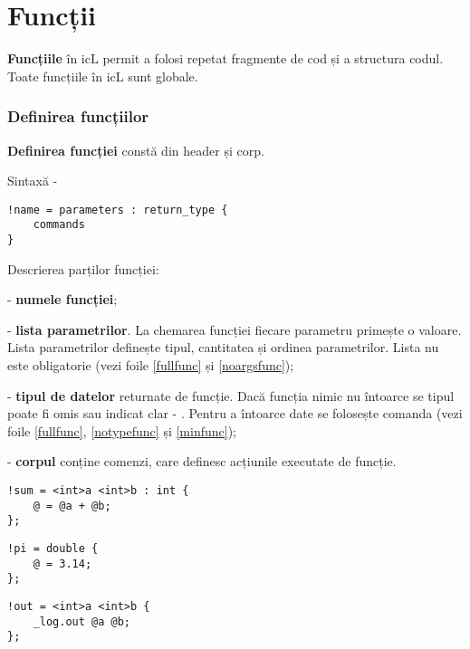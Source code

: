\section{Funcții}

{\bf Funcțiile} în icL permit a folosi repetat fragmente de cod și a structura codul. Toate funcțiile în icL sunt globale.

\subsubsection{Definirea funcțiilor}

{\bf Definirea funcției} constă din header și corp.

\noindent Sintaxă -
\begin{lstlisting}[numbers=none]
!name = parameters : return_type {
	commands
}
\end{lstlisting}

Descrierea parților funcției:
\begin{icItems}
\item
	 - {\bf numele funcției};
\item
	 - {\bf lista parametrilor}. La chemarea funcției fiecare parametru primește o valoare. Lista parametrilor definește tipul, cantitatea și ordinea parametrilor. Lista nu este obligatorie (vezi foile \ref{fullfunc} și \ref{noargsfunc});
\item
	 - {\bf tipul de datelor} returnate de funcție. Dacă funcția nimic nu întoarce se tipul poate fi omis sau indicat clar - \void{}. Pentru a întoarce date se folosește comanda  (vezi foile \ref{fullfunc}, \ref{notypefunc} și \ref{minfunc});
\item
	 - {\bf corpul} conține comenzi, care definesc acțiunile executate de funcție.
\end{icItems}

\begin{lstlisting}[caption=Funcție completă, label=fullfunc]
!sum = <int>a <int>b : int {
	@ = @a + @b;
};
\end{lstlisting}

\begin{lstlisting}[caption=Funcție fără argumente, label=noargsfunc]
!pi = double {
	@ = 3.14;
};
\end{lstlisting}

\begin{lstlisting}[caption=Funcție făra tip de date, label=notypefunc]
!out = <int>a <int>b {
	_log.out @a @b;
};
\end{lstlisting}


